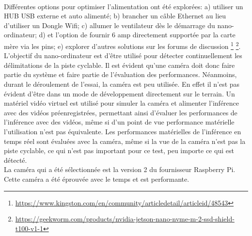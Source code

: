 \vspace{\baselineskip}
\\
\noindent Différentes options pour optimiser l'alimentation ont été explorées: a) utiliser un HUB USB externe et auto alimenté; b) brancher un câble Ethernet au lieu d'utiliser un Dongle Wifi; c) allumer le ventilateur dès le démarrage du nano-ordinateur; d) et l'option de fournir 6 amp directement supportée par la carte mère via les pins; e) explorer d'autres solutions sur les forums de discussion \footnote{\url{https://www.kingston.com/en/community/articledetail/articleid/48543}} \footnote{\url{https://geekworm.com/products/nvidia-jetson-nano-nvme-m-2-ssd-shield-t100-v1-1}}.
\vspace{\baselineskip}
\\
\noindent L'objectif du nano-ordinateur est d'être utilisé pour détecter continuellement les délimitations de la piste cyclable. Il est évident qu'une caméra doit donc faire partie du système et faire partie de l'évaluation des performances. Néanmoins, durant le déroulement de l'essai, la caméra est peu utilisée. En effet il n'est pas évident d'être dans un mode de développement directement sur le terrain. Un matériel vidéo virtuel est utilisé pour simuler la caméra et alimenter l'inférence avec des vidéos préenregistrées, permettant ainsi d'évaluer les performances de l'inférence avec des vidéos, même si d'un point de vue performance matérielle l'utilisation n'est pas équivalente. Les performances matérielles de l'inférence en temps réel sont évaluées avec la caméra, même si la vue de la caméra n'est pas la piste cyclable, ce qui n'est pas important pour ce test, peu importe ce qui est détecté. 
\vspace{\baselineskip}
\\
\noindent La caméra qui a été sélectionnée est la version 2 du fournisseur Raspberry Pi. Cette caméra a été éprouvée avec le temps et est performante. 
\vspace{\baselineskip}
\\
